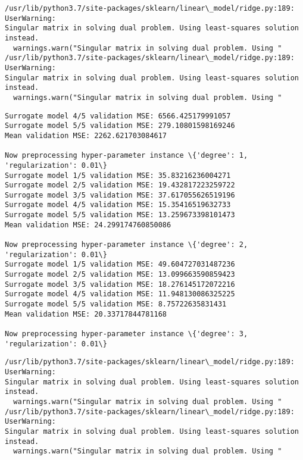 \documentclass[11pt]{article}
\begin{document}
    \begin{Verbatim}[commandchars=\\\{\}]
/usr/lib/python3.7/site-packages/sklearn/linear\_model/ridge.py:189: UserWarning:
Singular matrix in solving dual problem. Using least-squares solution instead.
  warnings.warn("Singular matrix in solving dual problem. Using "
/usr/lib/python3.7/site-packages/sklearn/linear\_model/ridge.py:189: UserWarning:
Singular matrix in solving dual problem. Using least-squares solution instead.
  warnings.warn("Singular matrix in solving dual problem. Using "
    \end{Verbatim}

    \begin{Verbatim}[commandchars=\\\{\}]
Surrogate model 4/5 validation MSE: 6566.425179991057
Surrogate model 5/5 validation MSE: 279.10801598169246
Mean validation MSE: 2262.621703084617

Now preprocessing hyper-parameter instance \{'degree': 1, 'regularization': 0.01\}
Surrogate model 1/5 validation MSE: 35.83216236004271
Surrogate model 2/5 validation MSE: 19.432817223259722
Surrogate model 3/5 validation MSE: 37.617055626519196
Surrogate model 4/5 validation MSE: 15.35416519632733
Surrogate model 5/5 validation MSE: 13.259673398101473
Mean validation MSE: 24.299174760850086

Now preprocessing hyper-parameter instance \{'degree': 2, 'regularization': 0.01\}
Surrogate model 1/5 validation MSE: 49.604727031487236
Surrogate model 2/5 validation MSE: 13.099663590859423
Surrogate model 3/5 validation MSE: 18.276145172072216
Surrogate model 4/5 validation MSE: 11.948130086325225
Surrogate model 5/5 validation MSE: 8.75722635831431
Mean validation MSE: 20.33717844781168

Now preprocessing hyper-parameter instance \{'degree': 3, 'regularization': 0.01\}
    \end{Verbatim}

    \begin{Verbatim}[commandchars=\\\{\}]
/usr/lib/python3.7/site-packages/sklearn/linear\_model/ridge.py:189: UserWarning:
Singular matrix in solving dual problem. Using least-squares solution instead.
  warnings.warn("Singular matrix in solving dual problem. Using "
/usr/lib/python3.7/site-packages/sklearn/linear\_model/ridge.py:189: UserWarning:
Singular matrix in solving dual problem. Using least-squares solution instead.
  warnings.warn("Singular matrix in solving dual problem. Using "
    \end{Verbatim}
\end{document}
